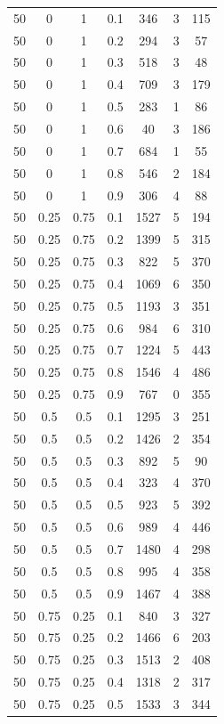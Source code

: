 \documentclass[a4paper,oneside,14pt]{extreport}
\begin{document}
\begin{table}[h]
\begin{center}
\begin{tabular}{|c|c|c|c|c|c|c|}
		  50 & 0 & 1 & 0.1 & 346 & 3 & 115 \\
		 50 & 0 & 1 & 0.2 & 294 & 3 & 57 \\
		 50 & 0 & 1 & 0.3 & 518 & 3 & 48 \\
		 50 & 0 & 1 & 0.4 & 709 & 3 & 179 \\
		 50 & 0 & 1 & 0.5 & 283 & 1 & 86 \\
		 50 & 0 & 1 & 0.6 & 40 & 3 & 186 \\
		 50 & 0 & 1 & 0.7 & 684 & 1 & 55 \\
		 50 & 0 & 1 & 0.8 & 546 & 2 & 184 \\
		 50 & 0 & 1 & 0.9 & 306 & 4 & 88 \\
		 50 & 0.25 & 0.75 & 0.1 & 1527 & 5 & 194 \\
		 50 & 0.25 & 0.75 & 0.2 & 1399 & 5 & 315 \\
		 50 & 0.25 & 0.75 & 0.3 & 822 & 5 & 370 \\
		 50 & 0.25 & 0.75 & 0.4 & 1069 & 6 & 350 \\
		 50 & 0.25 & 0.75 & 0.5 & 1193 & 3 & 351 \\
		 50 & 0.25 & 0.75 & 0.6 & 984 & 6 & 310 \\
		 50 & 0.25 & 0.75 & 0.7 & 1224 & 5 & 443 \\
		 50 & 0.25 & 0.75 & 0.8 & 1546 & 4 & 486 \\
		 50 & 0.25 & 0.75 & 0.9 & 767 & 0 & 355 \\
		 50 & 0.5 & 0.5 & 0.1 & 1295 & 3 & 251 \\
		 50 & 0.5 & 0.5 & 0.2 & 1426 & 2 & 354 \\
		 50 & 0.5 & 0.5 & 0.3 & 892 & 5 & 90 \\
		 50 & 0.5 & 0.5 & 0.4 & 323 & 4 & 370 \\
		 50 & 0.5 & 0.5 & 0.5 & 923 & 5 & 392 \\
		 50 & 0.5 & 0.5 & 0.6 & 989 & 4 & 446 \\
		 50 & 0.5 & 0.5 & 0.7 & 1480 & 4 & 298 \\
		 50 & 0.5 & 0.5 & 0.8 & 995 & 4 & 358 \\
		 50 & 0.5 & 0.5 & 0.9 & 1467 & 4 & 388 \\
		 50 & 0.75 & 0.25 & 0.1 & 840 & 3 & 327 \\
		 50 & 0.75 & 0.25 & 0.2 & 1466 & 6 & 203 \\
		 50 & 0.75 & 0.25 & 0.3 & 1513 & 2 & 408 \\
		 50 & 0.75 & 0.25 & 0.4 & 1318 & 2 & 317 \\
		 50 & 0.75 & 0.25 & 0.5 & 1533 & 3 & 344 \\

\end{tabular}
\end{center}
\end{table}
\end{document}
